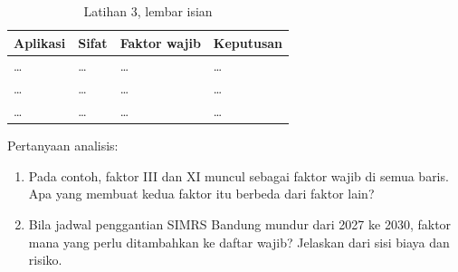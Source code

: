 \begin{table}[!htb]
  \centering
  \footnotesize
  \caption{Latihan 3, lembar isian}
  \label{tab:ch05-lat3-hasil}
  \begin{tabularx}{\textwidth}{>{\raggedright\arraybackslash}p{2.1cm}
    >{\raggedright\arraybackslash}X >{\raggedright\arraybackslash}p{2.1cm}
    >{\raggedright\arraybackslash}X}
    \hline
    \textbf{Aplikasi} & \textbf{Sifat} & \textbf{Faktor wajib} & \textbf{Keputusan} \\
    \hline
    \dots & \dots & \dots & \dots \\ \hline
    \dots & \dots & \dots & \dots \\ \hline
    \dots & \dots & \dots & \dots \\ \hline
  \end{tabularx}
\end{table}

Pertanyaan analisis:
\begin{enumerate}
  \item Pada contoh, faktor III dan XI muncul sebagai faktor wajib di semua baris. Apa yang
        membuat kedua faktor itu berbeda dari faktor lain?
  \item Bila jadwal penggantian SIMRS Bandung mundur dari 2027 ke 2030, faktor mana yang
        perlu ditambahkan ke daftar wajib? Jelaskan dari sisi biaya dan risiko.
\end{enumerate}

